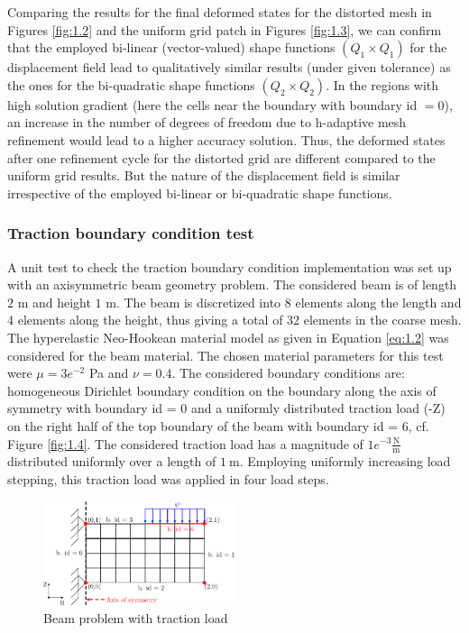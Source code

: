 \documentclass[11pt,a4paper,final]{article}
\begin{document}
Comparing the results for the final deformed states for the distorted mesh in Figures \eqref{fig:1.2} and the uniform grid patch in Figures \eqref{fig:1.3}, we can confirm that the employed bi-linear (vector-valued) shape functions $(Q_1 \times Q_1)$ for the displacement field lead to qualitatively similar results (under given tolerance) as the ones for the bi-quadratic shape functions $(Q_2 \times Q_2)$. In the regions with high solution gradient (here the cells near the boundary with boundary id $= 0$), an increase in the number of degrees of freedom due to h-adaptive mesh refinement would lead to a higher accuracy solution. Thus, the deformed states after one refinement cycle for the distorted grid are different compared to the uniform grid results. But the nature of the displacement field is similar irrespective of the employed bi-linear or bi-quadratic shape functions. \par 

\subsubsection{Traction boundary condition test}
A unit test to check the traction boundary condition implementation was set up with an axisymmetric beam geometry problem. The considered beam is of length $2$ m and height $1$ m. The beam is discretized into 8 elements along the length and 4 elements along the height, thus giving a total of 32 elements in the coarse mesh. The hyperelastic Neo-Hookean material model as given in Equation \eqref{eq:1.2} was considered for the beam material. The chosen material parameters for this test were $\mu = 3e^{-2}$ Pa and $\nu = 0.4$. The considered boundary conditions are: homogeneous Dirichlet boundary condition on the boundary along the axis of symmetry with boundary id = 0 and a uniformly distributed traction load (-Z) on the right half of the top boundary of the beam with boundary id = 6, cf. Figure \eqref{fig:1.4}. The considered traction load has a magnitude of $1e^{-3} \frac{\text{N}}{\text{m}}$ distributed uniformly over a length of $1 \ \text{m}$. Employing uniformly increasing load stepping, this traction load was applied in four load steps. \par    

\begin{figure}[h]
\centering 
\includegraphics[width=0.5\textwidth]{beam_grid.pdf}
\caption{Beam problem with traction load}
\label{fig:1.4}
\end{figure} 
\end{document}
